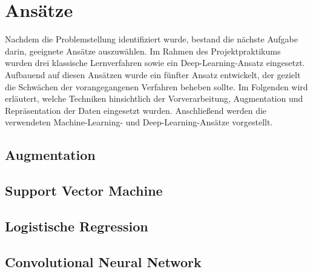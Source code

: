 \documentclass[researchlab,palatino]{AIGpaper}
\begin{document}
\section{Ans\"atze}
\label{sec:Ansaetze}
Nachdem die Problemstellung identifiziert wurde, bestand die n\"achste Aufgabe darin, geeignete Ans\"atze auszuw\"ahlen. Im Rahmen des Projektpraktikums wurden drei klassische Lernverfahren sowie ein Deep-Learning-Ansatz eingesetzt. Aufbauend auf diesen Ans\"atzen wurde ein f\"unfter Ansatz entwickelt, der gezielt die Schw\"achen der vorangegangenen Verfahren beheben sollte. Im Folgenden wird erl\"autert, welche Techniken hinsichtlich der Vorverarbeitung, Augmentation und Repr\"asentation der Daten eingesetzt wurden. Anschließend werden die verwendeten Machine-Learning- und Deep-Learning-Ans\"atze vorgestellt.



\subsection{Augmentation}
\label{sec:Augmentation}





\subsection{Support Vector Machine}
\label{SVM}


\subsection{Logistische Regression}
\label{Logistische Regression}


\subsection{Convolutional Neural Network}
\label{CNN}

\end{document}
